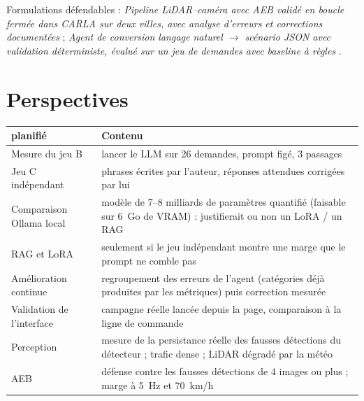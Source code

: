 \documentclass[11pt,a4paper]{article}
\providecommand{\og}{\guillemotleft\nobreakspace}
\providecommand{\fg}{\nobreakspace\guillemotright}
\newcommand{\plan}{\textcolor{badc}{\textbf{planifi\'e}}}
\begin{document}
Formulations d\'efendables : \emph{\og Pipeline LiDAR--cam\'era avec AEB valid\'e en boucle ferm\'ee dans CARLA sur deux villes, avec analyse d'erreurs et corrections document\'ees \fg} ; \emph{\og Agent de conversion langage naturel $\rightarrow$ sc\'enario JSON
avec validation d\'eterministe, \'evalu\'e sur un jeu de demandes avec baseline \`a r\`egles \fg}.

\section{Perspectives}
\begin{tabular}{@{}p{5cm}p{10cm}@{}}\toprule
\plan & Contenu \\\midrule
Mesure du jeu B & lancer le LLM sur 26 demandes, prompt fig\'e, 3 passages \\
Jeu C ind\'ependant & phrases \'ecrites par l'auteur, r\'eponses attendues corrig\'ees par lui \\
Comparaison Ollama local & mod\`ele de 7--8 milliards de param\`etres quantifi\'e (faisable sur 6~Go de VRAM) : justifierait ou non un LoRA / un RAG \\
RAG et LoRA & seulement si le jeu ind\'ependant montre une marge que le prompt ne comble pas \\
Am\'elioration continue & regroupement des erreurs de l'agent (cat\'egories d\'ej\`a produites par les m\'etriques) puis correction mesur\'ee \\
Validation de l'interface & campagne r\'eelle lanc\'ee depuis la page, comparaison \`a la ligne de commande \\
Perception & mesure de la persistance r\'eelle des fausses d\'etections du d\'etecteur ; trafic dense ; LiDAR d\'egrad\'e par la m\'et\'eo \\
AEB & d\'efense contre les fausses d\'etections de 4 images ou plus ; marge \`a 5~Hz et 70~km/h \\
\bottomrule\end{tabular}

\appendix
\end{document}
